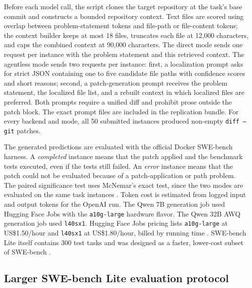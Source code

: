 \documentclass[preprint,12pt]{elsarticle}
\begin{document}
Before each model call, the script clones the target repository at the task's base commit and constructs a bounded repository context. Text files are scored using overlap between problem-statement tokens and file-path or file-content tokens; the context builder keeps at most 18 files, truncates each file at 12,000 characters, and caps the combined context at 90,000 characters. The direct mode sends one request per instance with the problem statement and this retrieved context. The agentless mode sends two requests per instance: first, a localization prompt asks for strict JSON containing one to five candidate file paths with confidence scores and short reasons; second, a patch-generation prompt receives the problem statement, the localized file list, and a rebuilt context in which localized files are preferred. Both prompts require a unified diff and prohibit prose outside the patch block. The exact prompt files are included in the replication bundle. For every backend and mode, all 50 submitted instances produced non-empty \texttt{diff --git} patches.

The generated predictions are evaluated with the official Docker SWE-bench harness. A \textit{completed} instance means that the patch applied and the benchmark tests executed, even if the tests still failed. An \textit{error} instance means that the patch could not be evaluated because of a patch-application or path problem. The paired significance test uses McNemar's exact test, since the two modes are evaluated on the same task instances \cite{fagerland2013mcnemar}. Token cost is estimated from logged input and output tokens for the OpenAI run. The Qwen 7B generation job used Hugging Face Jobs with the \texttt{a10g-large} hardware flavor. The Qwen 32B AWQ generation job used \texttt{l40sx1}. Hugging Face Jobs pricing lists \texttt{a10g-large} at US\$1.50/hour and \texttt{l40sx1} at US\$1.80/hour, billed by running time \cite{huggingface2026jobspricing}. SWE-bench Lite itself contains 300 test tasks and was designed as a faster, lower-cost subset of SWE-bench \cite{swebenchlitepage,swebenchleaderboard}.

\subsection{Larger SWE-bench Lite evaluation protocol}
\end{document}
